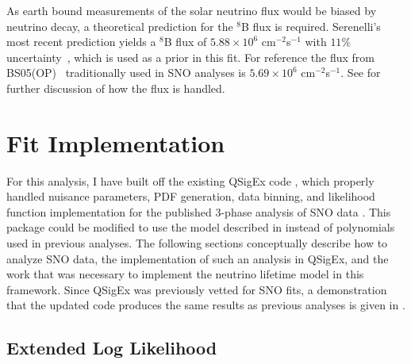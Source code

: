 As earth bound measurements of the solar neutrino flux would be biased by neutrino decay, a theoretical prediction for the $^8$B flux is required.
Serenelli's most recent prediction yields a $^8$B flux of $5.88\times10^{6}$ cm$^{-2}$s$^{-1}$ with $11\%$ uncertainty~\cite{serenelli}, which is used as a prior in this fit.
For reference the flux from BS05(OP)~\cite{bs05op} traditionally used in SNO analyses is $5.69\times10^6$ cm$^{-2}$s$^{-1}$.
See  for further discussion of how the flux is handled.

\section{Fit Implementation}
\label{fit_impl}

For this analysis, I have built off the existing QSigEx code \cite{plthesis}, which properly handled nuisance parameters, PDF generation, data binning, and likelihood function implementation for the published 3-phase analysis of SNO data \cite{3phase}.
This package could be modified to use the model described in  instead of polynomials used in previous analyses.
The following sections conceptually describe how to analyze SNO data, the implementation of such an analysis in QSigEx, and the work that was necessary to implement the neutrino lifetime model in this framework.
Since QSigEx was previously vetted for SNO fits, a demonstration that the updated code produces the same results as previous analyses is given in .

\subsection{Extended Log Likelihood}

